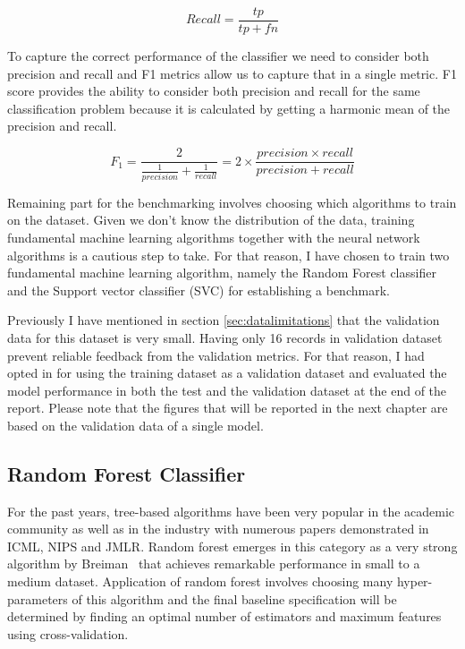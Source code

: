 \begin{equation}
    Recall = \frac{tp}{tp + fn}
\end{equation}

To capture the correct performance of the classifier we need to consider both precision and recall and F1 metrics allow us to capture that in a single metric.
F1 score provides the ability to consider both precision and recall for the same classification problem because it is calculated by getting a harmonic mean of the precision and recall.

\begin{equation}
    F_1 = \frac{2}{\frac{1}{precision} + \frac{1}{recall}} = 2 \times \frac{precision \times recall}{precision + recall}
\end{equation}


Remaining part for the benchmarking involves choosing which algorithms to train on the dataset.
Given we don't know the distribution of the data, training fundamental machine learning algorithms together with the neural network algorithms is a cautious step to take. 
For that reason, I have chosen to train two fundamental machine learning algorithm, namely the Random Forest classifier and the Support vector classifier (SVC) for establishing a benchmark.

Previously I have mentioned in section \ref{sec:datalimitations} that the validation data for this dataset is very small.
Having only 16 records in validation dataset prevent reliable feedback from the validation metrics. 
For that reason, I had opted in for using the training dataset as a validation dataset and evaluated the model performance in both the test and the validation dataset at the end of the report.
Please note that the figures that will be reported in the next chapter are based on the validation data of a single model.


\subsection{Random Forest Classifier}
For the past years, tree-based algorithms have been very popular in the academic community as well as in the industry with numerous papers demonstrated in ICML, NIPS and JMLR.
Random forest emerges in this category as a very strong algorithm by Breiman~\cite{randomforest} that achieves remarkable performance in small to a medium dataset.
Application of random forest involves choosing many hyper-parameters of this algorithm and 
the final baseline specification will be determined by finding an optimal number of estimators and maximum features using cross-validation.


